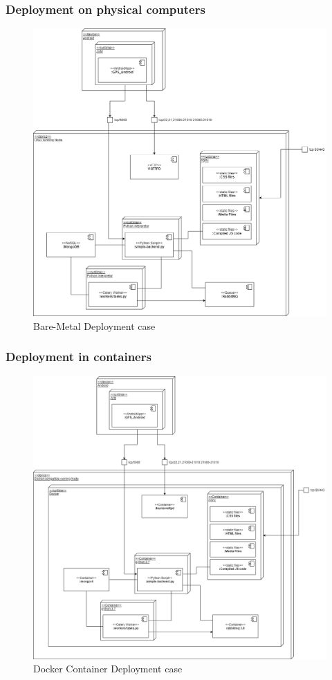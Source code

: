 \subsubsection{Deployment on physical computers}\label{bare-metal-deployment}

\begin{figure}[H]
\centering
\includegraphics[width=\linewidth]{schemes/deployment/DeploymentDiagram-BareMetall.png}
\caption{Bare-Metal Deployment case}
\end{figure}

\subsubsection{Deployment in containers}\label{containerized-deployment}

\begin{figure}[H]
	\centering
	\includegraphics[width=\linewidth]{schemes/deployment/DeploymentDiagram-Containerized.png}
\caption{Docker Container Deployment case}
\end{figure}
